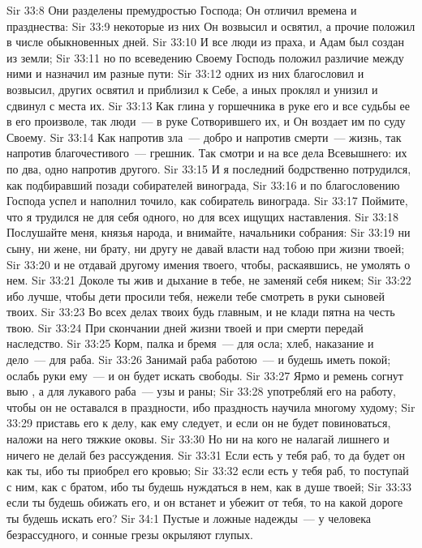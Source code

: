 \vs Sir 33:8 Они разделены премудростью Господа; Он отличил времена и празднества:
\vs Sir 33:9 некоторые из них Он возвысил и освятил, а прочие положил в числе обыкновенных дней.
\vs Sir 33:10 И все люди из праха, и Адам был создан из земли;
\vs Sir 33:11 но по всеведению Своему Господь положил различие между ними и назначил им разные пути:
\vs Sir 33:12 одних из них благословил и возвысил, других освятил и приблизил к Себе, а иных проклял и унизил и сдвинул с места их.
\vs Sir 33:13 Как глина у горшечника в руке его и все судьбы ее в его произволе, так люди~--- в руке Сотворившего их, и Он воздает им по суду Своему.
\vs Sir 33:14 Как напротив зла~--- добро и напротив смерти~--- жизнь, так напротив благочестивого~--- грешник. Так смотри и на все дела Всевышнего: их по два, одно напротив другого.
\vs Sir 33:15 И я последний бодрственно потрудился, как подбиравший позади собирателей винограда,
\vs Sir 33:16 и по благословению Господа успел и наполнил точило, как собиратель винограда.
\vs Sir 33:17 Поймите, что я трудился не для себя одного, но для всех ищущих наставления.
\rsbpar\vs Sir 33:18 Послушайте меня, князья народа, и внимайте, начальники собрания:
\vs Sir 33:19 ни сыну, ни жене, ни брату, ни другу не давай власти над тобою при жизни твоей;
\vs Sir 33:20 и не отдавай другому имения твоего, чтобы, раскаявшись, не умолять о нем.
\vs Sir 33:21 Доколе ты жив и дыхание в тебе, не заменяй себя никем;
\vs Sir 33:22 ибо лучше, чтобы дети просили тебя, нежели тебе смотреть в руки сыновей твоих.
\vs Sir 33:23 Во всех делах твоих будь главным, и не клади пятна на честь твою.
\vs Sir 33:24 При скончании дней жизни твоей и при смерти передай наследство.
\vs Sir 33:25 Корм, палка и бремя~--- для осла; хлеб, наказание и дело~--- для раба.
\vs Sir 33:26 Занимай раба работою~--- и будешь иметь покой; ослабь руки ему~--- и он будет искать свободы.
\vs Sir 33:27 Ярмо и ремень согнут выю , а для лукавого раба~--- узы и раны;
\vs Sir 33:28 употребляй его на работу, чтобы он не оставался в праздности, ибо праздность научила многому худому;
\vs Sir 33:29 приставь его к делу, как ему следует, и если он не будет повиноваться, наложи на него тяжкие оковы.
\vs Sir 33:30 Но ни на кого не налагай лишнего и ничего не делай без рассуждения.
\vs Sir 33:31 Если есть у тебя раб, то да будет он как ты, ибо ты приобрел его кровью;
\vs Sir 33:32 если есть у тебя раб, то поступай с ним, как с братом, ибо ты будешь нуждаться в нем, как в душе твоей;
\vs Sir 33:33 если ты будешь обижать его, и он встанет и убежит от тебя, то на какой дороге ты будешь искать его?
\vs Sir 34:1 Пустые и ложные надежды~--- у человека безрассудного, и сонные грезы окрыляют глупых.
